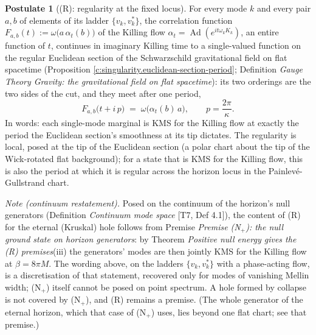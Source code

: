 \documentclass[11pt]{article}
\theoremstyle{definition}
\newtheorem{postulate}[theorem]{Postulate}
\theoremstyle{plain}
\newcommand{\changedmark}[2]{\marginpar{\raggedright\scriptsize\color{#1}#2}}
\begin{document}
\begin{postulate}[(R): regularity at the fixed locus]\label{c:singularity.r-regularity-fixed-locus}
\changedmark{BurntOrange}{changed since the deposit}
For every mode $k$ and every pair $a, b$ of elements of its ladder $\{v_k, v_k^{*}\}$, the correlation function $F_{a,b}(t) := \omega\bigl(a\,\alpha_t(b)\bigr)$ of the Killing flow $\alpha_t = \operatorname{Ad}(e^{it\omega_k K_k})$, an entire function of $t$, continues in imaginary Killing time to a single-valued function on the regular Euclidean section of the Schwarzschild gravitational field on flat spacetime (Proposition \ref{c:singularity.euclidean-section-period}; Definition \emph{Gauge Theory Gravity: the gravitational field on flat spacetime}): its two orderings are the two sides of the cut, and they meet after one period,
\[
F_{a,b}\bigl(t + i\,p\bigr) \;=\; \omega\bigl(\alpha_t(b)\,a\bigr), \qquad p = \frac{2\pi}{\kappa} .
\]
In words: each single-mode marginal is KMS for the Killing flow at exactly the period the Euclidean section's smoothness at its tip dictates. The regularity is local, posed at the tip of the Euclidean section (a polar chart about the tip of the Wick-rotated flat background); for a state that is KMS for the Killing flow, this is also the period at which it is regular across the horizon locus in the Painlev\'e-Gullstrand chart.

\emph{Note (continuum restatement).} Posed on the continuum of the horizon's null generators (Definition \emph{Continuum mode space} [T7, Def 4.1]), the content of (R) for the eternal (Kruskal) hole follows from Premise \emph{Premise (N$_{+}$): the null ground state on horizon generators}: by Theorem \emph{Positive null energy gives the (R) premises}(iii) the generators' modes are then jointly KMS for the Killing flow at $\beta = 8\pi M$. The wording above, on the ladders $\{v_{k}, v_{k}^{*}\}$ with a phase-acting flow, is a discretisation of that statement, recovered only for modes of vanishing Mellin width; (N$_{+}$) itself cannot be posed on point spectrum. A hole formed by collapse is not covered by (N$_{+}$), and (R) remains a premise. (The whole generator of the eternal horizon, which that case of (N$_{+}$) uses, lies beyond one flat chart; see that premise.)
\end{postulate}
\end{document}

